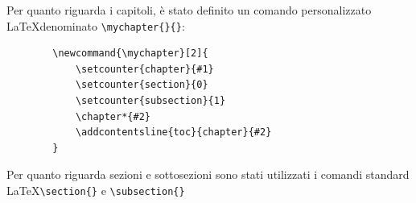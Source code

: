 \documentclass[a4paper]{report}
\newcommand{\mychapter}[2]{
	\setcounter{chapter}{#1}
	\setcounter{section}{0}
	\setcounter{subsection}{1}
	\chapter*{#2}
	\addcontentsline{toc}{chapter}{#2}
}
\begin{document}
	Per quanto riguarda i capitoli, è stato definito un comando personalizzato \LaTeX \space denominato
	\verb|\mychapter{}{}|:
	\begin{verbatim}
		\newcommand{\mychapter}[2]{
			\setcounter{chapter}{#1}
			\setcounter{section}{0}
			\setcounter{subsection}{1}
			\chapter*{#2}
			\addcontentsline{toc}{chapter}{#2}
		}
	\end{verbatim}
	Per quanto riguarda sezioni e sottosezioni sono stati utilizzati i comandi standard \LaTeX \space \verb|\section{}| e
	\verb|\subsection{}| 
\end{document}
